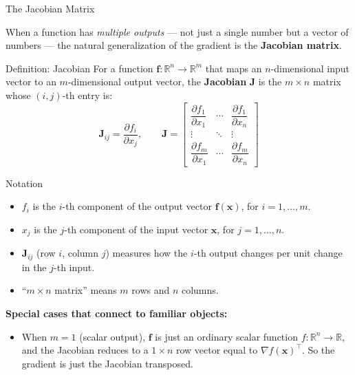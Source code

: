 \documentclass[aspectratio=169,10pt]{beamer}
\newcommand{\x}{\mathbf{x}}
\begin{document}
\begin{frame}[allowframebreaks]{The Jacobian Matrix}

  When a function has \emph{multiple outputs} --- not just a single
  number but a vector of numbers --- the natural generalization of the
  gradient is the \textbf{Jacobian matrix}.

  \begin{block}{Definition: Jacobian}
    For a function $\mathbf{f}:\mathbb{R}^n \to \mathbb{R}^m$ that maps
    an $n$-dimensional input vector to an $m$-dimensional output vector,
    the \textbf{Jacobian} $\mathbf{J}$ is the $m \times n$ matrix whose
    $(i,j)$-th entry is:
    \[
      \mathbf{J}_{ij} = \frac{\partial f_i}{\partial x_j}, \qquad
      \mathbf{J}
      =
      \begin{bmatrix}
        \dfrac{\partial f_1}{\partial x_1} & \cdots & \dfrac{\partial f_1}{\partial x_n}\\[8pt]
        \vdots & \ddots & \vdots\\[4pt]
        \dfrac{\partial f_m}{\partial x_1} & \cdots & \dfrac{\partial f_m}{\partial x_n}
      \end{bmatrix}
    \]
  \end{block}

  \begin{block}{Notation}
    \begin{itemize}
      \item $f_i$ is the $i$-th component of the output vector
            $\mathbf{f}(\x)$, for $i = 1, \ldots, m$.
      \item $x_j$ is the $j$-th component of the input vector $\x$,
            for $j = 1, \ldots, n$.
      \item $\mathbf{J}_{ij}$ (row $i$, column $j$) measures how the
            $i$-th output changes per unit change in the $j$-th input.
      \item ``$m \times n$ matrix'' means $m$ rows and $n$ columns.
    \end{itemize}
  \end{block}

  \framebreak

  \textbf{Special cases that connect to familiar objects:}

  \begin{itemize}
    \item When $m=1$ (scalar output), $\mathbf{f}$ is just an ordinary
          scalar function $f:\mathbb{R}^n\to\mathbb{R}$, and the Jacobian
          reduces to a $1\times n$ row vector equal to $\nabla f(\x)^\top$.
          So the gradient is just the Jacobian transposed.


\end{itemize}
\end{frame}
\end{document}
